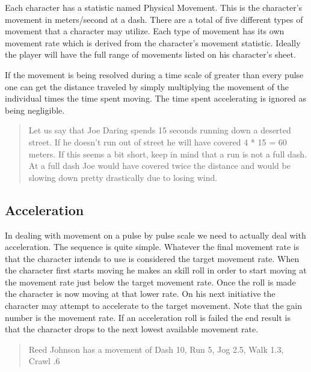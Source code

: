 Each character has a statistic named Physical Movement. This is the character's
movement in meters/second at a dash. There are a total of five different types
of movement that a character may utilize. Each type of movement has its own
movement rate which is derived from the character's movement statistic. 
Ideally the player will have the full range of movements listed on his 
character's sheet. 



If the movement is being resolved during a time scale of greater than every
pulse one can get the distance traveled by simply multiplying the movement 
of the individual times the time spent moving. The time spent accelerating
is ignored as being negligible.

\begin{quote}
Let us say that Joe Daring spends 15 seconds running down a deserted street.
If he doesn't run out of street he will have covered 4 * 15 = 60 meters. If 
this seems a bit short, keep in mind that a run is not a full dash. At a full
dash Joe would have covered twice the distance and would be slowing down pretty 
drastically due to losing wind.
\end{quote}

\subsection{Acceleration}


In dealing with movement on a pulse by pulse scale we need to actually
deal with acceleration. The sequence is quite simple. Whatever the
final movement  rate is that the character intends to use is considered
the target movement rate. When the character first starts moving he
makes an skill roll in order to start moving at the movement
rate just below the target movement rate. Once the roll is made the
character is now moving at that lower rate. On his next  initiative the
character may attempt to accelerate to the target movement. Note  that
the gain number is the movement rate. If an acceleration roll is failed
the end result is that the character drops to the next lowest available
movement  rate. 

\begin{quotation}
Reed Johnson has a movement of Dash 10, Run 5, Jog 2.5, Walk 1.3, Crawl .6
\end{quotation}

